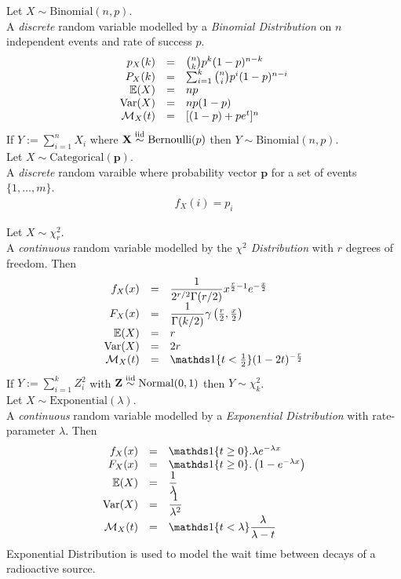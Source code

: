 \documentclass[11pt,a4paper]{article}
\begin{document}
Let $X\sim\text{Binomial}(n,p)$.\\
A \textit{discrete} random variable modelled by a \textit{Binomial Distribution} on $n$ independent events and rate of success $p$.\\
\[\begin{array}{rcl}
p_X(k)&=&{n\choose k}p^k(1-p)^{n-k}\\
P_X(k)&=&\sum_{i=1}^k{n\choose i}p^i(1-p)^{n-i}\\
\mathbb{E}(X)&=&np\\
\mathrm{Var}(X)&=&np(1-p)\\
\mathcal{M}_X(t)&=&[(1-p)+pe^t]^n
\end{array}\]
\nb If $Y:=\sum_{i=1}^nX_i$ where $\textbf{X}\overset{\text{iid}}{\sim}\text{Bernoulli}(p)$ then $Y\sim\text{Binomial}(n,p)$.\\

Let $X\sim\text{Categorical}(\textbf{p})$.\\
A \textit{discrete} random varaible where probability vector $\textbf{p}$ for a set of events $\{1,\dots,m\}$.\\
\[\begin{array}{rcl}
f_X(i)=p_i
\end{array}\]

Let $X\sim\chi^2_r$.\\
A \textit{continuous} random variable modelled by the \textit{$\chi^2$ Distribution} with $r$ degrees of freedom. Then
\[\begin{array}{rcl}
f_X(x)&=&\dfrac{1}{2^{r/2}\Gamma(r/2)}x^{\frac{r}{2}-1}e^{-\frac{x}{2}}\\
F_X(x)&=&\dfrac{1}{\Gamma(k/2)}\gamma\left(\frac{r}{2},\frac{x}{2}\right)\\
\expect(X)&=&r\\
\var(X)&=&2r\\
\mathcal{M}_X(t)&=&\indicator\{t<\frac{1}{2}\}(1-2t)^{-\frac{r}{2}}
\end{array}\]
\nb If $Y:=\sum_{i=1}^kZ_i^2$ with $\textbf{Z}\overset{\text{iid}}{\sim}\text{Normal}(0,1)$ then $Y\sim\chi^2_k$.\\

Let $X\sim\text{Exponential}(\lambda)$.\\
A \textit{continuous} random variable modelled by a \textit{Exponential Distribution} with rate-parameter $\lambda$. Then
\[\begin{array}{rcl}
f_X(x)&=&\indicator\{t\geq0\}.\lambda e^{-\lambda x}\\
F_X(x)&=&\indicator\{t\geq0\}.\left(1-e^{-\lambda x}\right)\\
\expect(X)&=&\dfrac{1}{\lambda}\\
\var(X)&=&\dfrac{1}{\lambda^2}\\
\mathcal{M}_X(t)&=&\indicator\{t<\lambda\}\dfrac{\lambda}{\lambda-t}
\end{array}\]
\nb Exponential Distribution is used to model the wait time between decays of a radioactive source.\\
\end{document}
